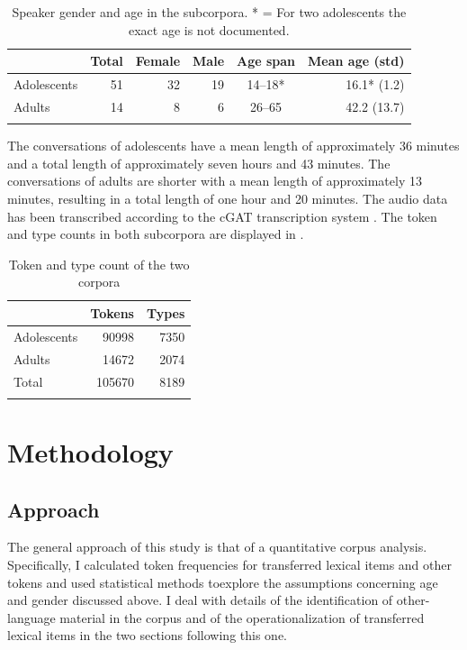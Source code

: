 \documentclass[output=paper]{langsci/langscibook}
\begin{document}
  
\begin{table}
\begin{tabular}{l rrr cr} 
\lsptoprule
& {Total} & {Female} & {Male} & {Age span} & {Mean age (std)}\\
\midrule
Adolescents & 51 & 32 & 19 & 14--18* & 16.1* (1.2)\\
Adults & 14 & 8 & 6 & 26--65 & 42.2 (13.7)\\
\lspbottomrule
\end{tabular}
\caption{Speaker gender and age in the subcorpora. * = For two adolescents the exact age is not documented.\label{tab:bracke:1}}
\end{table}  

The conversations of adolescents have a mean length of approximately 36 minutes and a total length of approximately seven hours and 43 minutes. The conversations of adults are shorter with a mean length of approximately 13 minutes, resulting in a total length of one hour and 20 minutes. The audio data has been transcribed according to the cGAT transcription system \citep{schmidt_cgat_2015}. The token and type counts in both subcorpora are displayed in .

\begin{table}
\begin{tabular}{lrr} 
\lsptoprule
& {Tokens} & {Types}\\
\midrule
{Adolescents} & {90998} & {7350}\\
{Adults} & {14672} & {2074}\\
{Total} & {105670} & {8189}\\
\lspbottomrule
\end{tabular}
\caption{Token and type count of the two corpora\label{tab:bracke:2}}
\end{table}  

 
\section{Methodology}
\label{sec:bracke:4}
 
   
\subsection{Approach}
\label{sec:bracke:4.1}
The general approach of this study is that of a quantitative corpus analysis. Specifically, I calculated token frequencies for transferred lexical items and other tokens and used statistical methods toexplore the assumptions concerning age and gender discussed above. I deal with details of the identification of other-language material in the corpus and of the operationalization of transferred lexical items in the two sections following this one.
\end{document}
